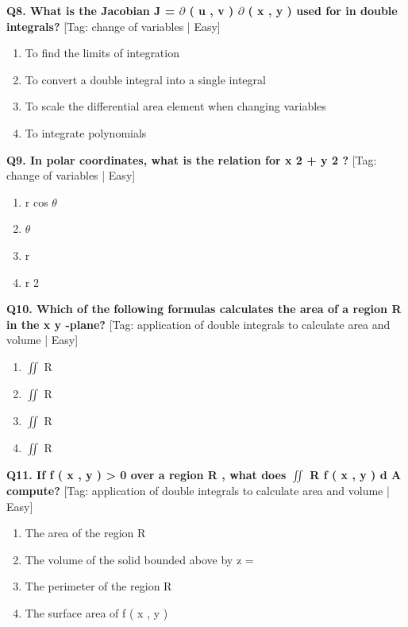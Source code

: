 \noindent\textbf{Q8. What is the Jacobian J = $\partial$ ( u , v ) $\partial$ ( x , y ) used for in double integrals?} \hfill [Tag: change of variables | Easy]
\begin{enumerate}[label=(\alph*),topsep=2pt,itemsep=1pt,partopsep=0pt,parsep=0pt]
    \item {{To find the limits of integration}}
    \item {{To convert a double integral into a single integral}}
    \item {{To scale the differential area element when changing variables}}
    \item {{To integrate polynomials}}
\end{enumerate}
\vspace{2mm}

\noindent\textbf{Q9. In polar coordinates, what is the relation for x 2 + y 2 ?} \hfill [Tag: change of variables | Easy]
\begin{enumerate}[label=(\alph*),topsep=2pt,itemsep=1pt,partopsep=0pt,parsep=0pt]
    \item {{r cos $\theta$}}
    \item {{$\theta$}}
    \item {{r}}
    \item {{r 2}}
\end{enumerate}
\vspace{2mm}

\noindent\textbf{Q10. Which of the following formulas calculates the area of a region R in the x y -plane?} \hfill [Tag: application of double integrals to calculate area and volume | Easy]
\begin{enumerate}[label=(\alph*),topsep=2pt,itemsep=1pt,partopsep=0pt,parsep=0pt]
    \item {{$\iint$ R}}
    \item {{$\iint$ R}}
    \item {{$\iint$ R}}
    \item {{$\iint$ R}}
\end{enumerate}
\vspace{2mm}

\noindent\textbf{Q11. If f ( x , y ) > 0 over a region R , what does $\iint$ R f ( x , y ) d A compute?} \hfill [Tag: application of double integrals to calculate area and volume | Easy]
\begin{enumerate}[label=(\alph*),topsep=2pt,itemsep=1pt,partopsep=0pt,parsep=0pt]
    \item {{The area of the region R}}
    \item {{The volume of the solid bounded above by z =}}
    \item {{The perimeter of the region R}}
    \item {{The surface area of f ( x , y )}}
\end{enumerate}
\vspace{2mm}

